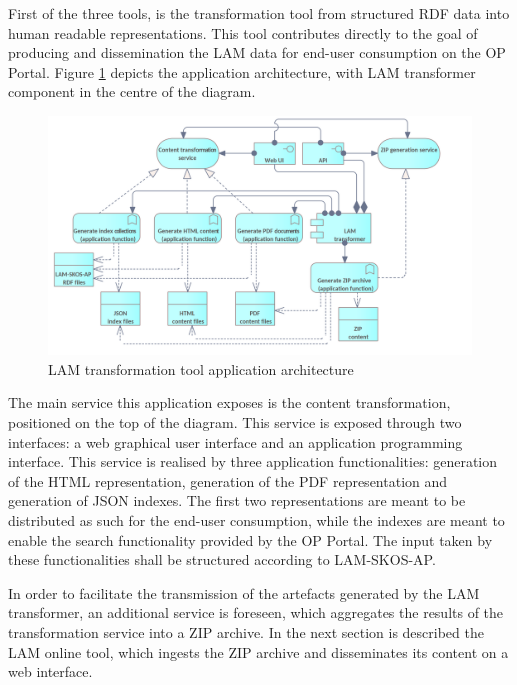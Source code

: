 	First of the three tools, is the transformation tool from structured RDF data into human readable representations. This tool contributes directly to the goal of producing and dissemination the LAM data for end-user consumption on the OP Portal. Figure \ref{fig:app-transformation-tool} depicts the application architecture, with LAM transformer component in the centre of the diagram.

    \begin{figure}[!h]
		\centering
		\includegraphics[width=.98\textwidth]{images/application/Content transformer.png}
		\caption{LAM transformation tool application architecture}
		\label{fig:app-transformation-tool}
	\end{figure}

	The main service this application exposes is the content transformation, positioned on the top of the diagram. This service is exposed through two interfaces: a web graphical user interface and an application programming interface. This service is realised by three application functionalities: generation of the HTML representation, generation of the PDF representation and generation of JSON indexes. The first two representations are meant to be distributed as such for the end-user consumption, while the indexes are meant to enable the search functionality provided by the OP Portal. The input taken by these functionalities shall be structured according to LAM-SKOS-AP\cite{lam-skos-ap-2019}.
	
	In order to facilitate the transmission of the artefacts generated by the LAM transformer, an additional service is foreseen, which aggregates the results of the transformation service into a ZIP archive. In the next section is described the LAM online tool, which ingests the ZIP archive and disseminates its content on a web interface. 
	

